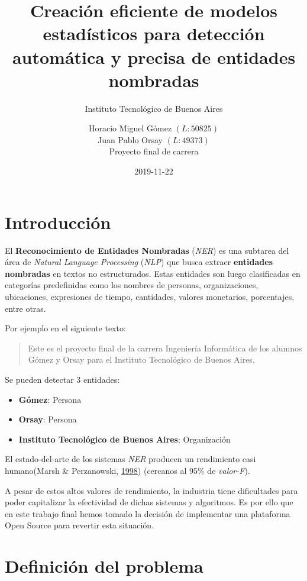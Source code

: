 \documentclass[12pt,a4paper,]{scrartcl}
\title{Creación eficiente de modelos estadísticos para detección automática y precisa de entidades nombradas}
\subtitle{Instituto Tecnológico de Buenos Aires}
\author{Horacio Miguel Gómez \((L:50825)\) \\ Juan Pablo Orsay \((L:49373)\) \\ Proyecto final de carrera}
\date{2019-11-22}
\providecommand{\tightlist}{%
  \setlength{\itemsep}{0pt}\setlength{\parskip}{0pt}}
\begin{document}
\maketitle

{
\setcounter{tocdepth}{2}
\tableofcontents
}
\newpage

\hypertarget{intro}{%
\section{Introducción}\label{intro}}

El \textbf{Reconocimiento de Entidades Nombradas} (\emph{NER}) es una subtarea del área de \emph{Natural Language Processing} (\emph{NLP}) que busca extraer \textbf{entidades nombradas} en textos no estructurados. Estas entidades son luego clasificadas en categorías predefinidas como los nombres de personas, organizaciones, ubicaciones, expresiones de tiempo, cantidades, valores monetarios, porcentajes, entre otras.

Por ejemplo en el siguiente texto:

\begin{quote}
Este es el proyecto final de la carrera Ingeniería Informática de los alumnos Gómez y Orsay para el Instituto Tecnológico de Buenos Aires.
\end{quote}

Se pueden detectar 3 entidades:

\begin{itemize}
\tightlist
\item
  \textbf{Gómez}: Persona
\item
  \textbf{Orsay}: Persona
\item
  \textbf{Instituto Tecnológico de Buenos Aires}: Organización
\end{itemize}

El estado-del-arte de los sistemas \emph{NER} producen un rendimiento casi humano(Marsh \& Perzanowski, \protect\hyperlink{ref-marsh-perzanowski-1998-muc}{1998}) (cercanos al 95\% de \emph{valor-F}).

A pesar de estos altos valores de rendimiento, la industria tiene dificultades para poder capitalizar la efectividad de dichas sistemas y algoritmos.
Es por ello que en este trabajo final hemos tomado la decisión de implementar una plataforma Open Source para revertir esta situación.

\newpage

\hypertarget{problem-definition}{%
\section{Definición del problema}\label{problem-definition}}
\end{document}
